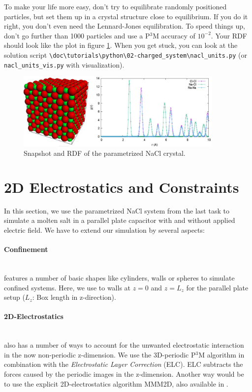 \documentclass[
a4paper,                        %
11pt,                           %
twoside,                        %
footsepline,                    %
headsepline,                    %
headexclude,                    %
footexclude,                    %
pagesize,                       %
]{scrartcl}
\begin{document}
To make your life more easy, don't try to equilibrate randomly positioned particles,
but set them up in a crystal structure close to equilibrium. If you do it right,
you don't even need the Lennard-Jones equilibration. 
To speed things up, don't go further than 1000 particles and use a P$^3$M accuracy of $10^{-2}$.
Your RDF should look like the plot in figure \ref{fig:nacl_units}. When you get stuck,
you can look at the solution script \verb|\doc\tutorials\python\02-charged_system\nacl_units.py| 
(or \verb|nacl_units_vis.py| with visualization).


\begin{figure}[h]
  \centering
  \includegraphics[width=0.9\textwidth]{figures/nacl_units}
  \caption{Snapshot and RDF of the parametrized NaCl crystal.}
  \label{fig:nacl_units}
\end{figure}

\section{2D Electrostatics and Constraints}

In this section, we use the parametrized NaCl system from the last task to simulate a molten salt in a
parallel plate capacitor with and without applied electric field. We have to extend our simulation by several aspects:

\paragraph{Confinement}\mbox{}\\
\es features a number of basic shapes like cylinders, walls or spheres to simulate confined systems.
Here, we use to walls at $z = 0$ and $z = L_z$ for the parallel plate setup ($L_z$: Box length in z-direction).
\paragraph{2D-Electrostatics}\mbox{}\\
\es also has a number of ways to account for the unwanted electrostatic interaction in the now non-periodic z-dimension.
We use the 3D-periodic P$^3$M algorithm in combination with the \emph{Electrostatic Layer Correction} (ELC). 
ELC subtracts the forces caused by the periodic images in the z-dimension. Another way would be to use the explicit 2D-electrostatics algorithm
MMM2D, also available in \es.
\end{document}
